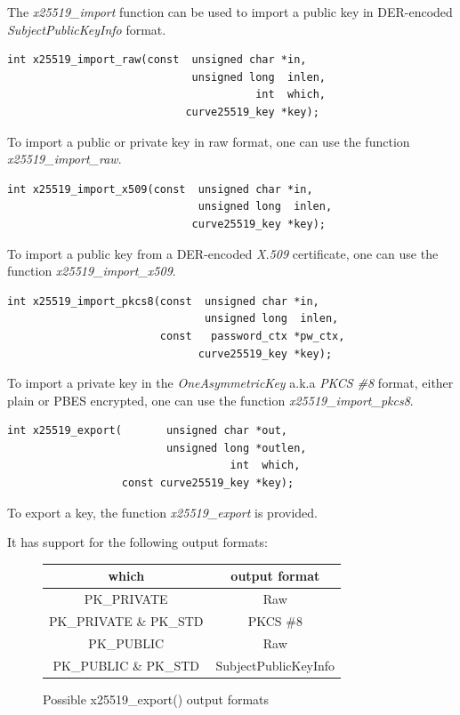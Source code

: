 \documentclass[synpaper]{book}
\begin{document}
The \textit{x25519\_import} function can be used to import a public key in DER-encoded \textit{SubjectPublicKeyInfo} format.

\begin{verbatim}
int x25519_import_raw(const  unsigned char *in,
                             unsigned long  inlen,
                                       int  which,
                            curve25519_key *key);
\end{verbatim}

To import a public or private key in raw format, one can use the function \textit{x25519\_import\_raw}.

\begin{verbatim}
int x25519_import_x509(const  unsigned char *in,
                              unsigned long  inlen,
                             curve25519_key *key);
\end{verbatim}

To import a public key from a DER-encoded \textit{X.509} certificate, one can use the function \textit{x25519\_import\_x509}.

\begin{verbatim}
int x25519_import_pkcs8(const  unsigned char *in,
                               unsigned long  inlen,
                        const   password_ctx *pw_ctx,
                              curve25519_key *key);
\end{verbatim}

To import a private key in the \textit{OneAsymmetricKey} a.k.a \textit{PKCS \#8} format, either plain or PBES encrypted,
one can use the function \textit{x25519\_import\_pkcs8}.

\begin{verbatim}
int x25519_export(       unsigned char *out,
                         unsigned long *outlen,
                                   int  which,
                  const curve25519_key *key);
\end{verbatim}

To export a key, the function \textit{x25519\_export} is provided.

It has support for the following output formats:

\begin{figure}[H]
\begin{center}
\begin{tabular}{|c|c|}
\hline \textbf{which} & \textbf{output format} \\
\hline PK\_PRIVATE & Raw \\
\hline PK\_PRIVATE \& PK\_STD & PKCS \#8 \\
\hline PK\_PUBLIC & Raw \\
\hline PK\_PUBLIC \& PK\_STD & SubjectPublicKeyInfo \\
\hline
\end{tabular}
\end{center}
\caption{Possible x25519\_export() output formats}
\end{figure}
\end{document}
